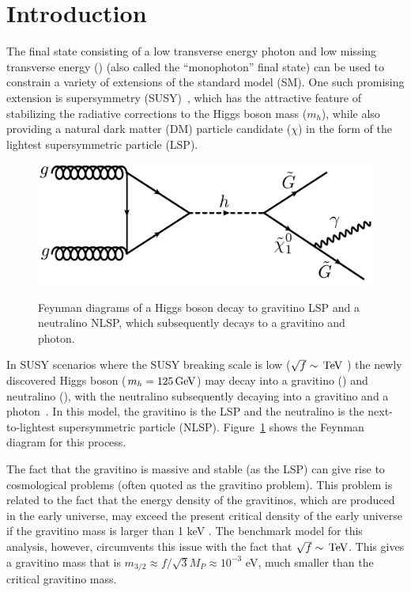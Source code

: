 \section{Introduction}

The final state consisting of a low transverse energy photon and low missing transverse energy (\met) (also called the ``monophoton'' final state) can be used to constrain a variety of extensions of the standard model (SM). One such promising extension is supersymmetry (SUSY)~\cite{GGMa,GGMd2,GGMd3,GGMd4,GGMd5,GGMd1,GGMd}, which has the attractive feature of stabilizing the radiative corrections to the Higgs boson mass ($m_{h}$), while also providing a natural dark matter (DM) particle candidate ($\chi$) in the form of the lightest supersymmetric particle (LSP). 

\begin{figure}[h]
\centering
{\includegraphics[width=0.55\columnwidth]{figures/susy_feynman}}
\caption{Feynman diagrams of a Higgs boson decay to gravitino LSP and a neutralino NLSP, which subsequently decays to a gravitino and photon.
}
\label{fig:feynman}
\end{figure}

In SUSY scenarios where the SUSY breaking scale is low ($\sqrt{f} \sim \,\text{Te\hspace{-.08em}V}$ ) the newly discovered Higgs boson ($m_h = 125 \,\text{Ge\hspace{-.08em}V}$) \cite{cmshiggs,atlashiggs} may decay into a gravitino (\PXXSG) and neutralino (\PSGczDo), with the neutralino subsequently decaying into a gravitino and a photon~\cite{Petersson:2012dp}. In this model, the gravitino is the LSP and the neutralino is the next-to-lightest supersymmetric particle (NLSP). Figure~\ref{fig:feynman} shows the Feynman diagram for this process. 

The fact that the gravitino is massive and stable (as the LSP) can give rise to cosmological problems (often quoted as the gravitino problem). 
This problem is related to the fact that the energy density of the gravitinos, which are produced in the early universe, may exceed the present critical density of the early universe if the gravitino mass is larger than 1 keV \cite{grav_prob}. 
The benchmark model for this analysis, however, circumvents this issue with the fact that $\sqrt{f} \sim \,\text{Te\hspace{-.08em}V}$. 
This gives a gravitino mass that is $m_{3/2} \approx f/\sqrt{3}M_{P} \approx 10^{-3}$ eV, much smaller than the critical gravitino mass.

